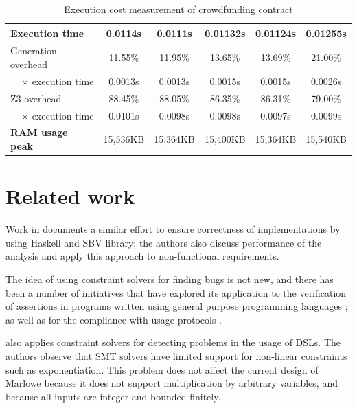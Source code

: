 \documentclass[english,runningheads]{llncs}
\begin{document}
\begin{table}[]
{\begin{tabular}{l||lllll}
\textbf{Execution time}                & \multicolumn{1}{c|}{0.0114s}  & \multicolumn{1}{c|}{0.0111s}  & \multicolumn{1}{c|}{0.01132s} & \multicolumn{1}{c|}{0.01124s} & \multicolumn{1}{c}{0.01255s} \\ \hline
Generation overhead                    & \multicolumn{1}{c|}{11.55\%}  & \multicolumn{1}{c|}{11.95\%}  & \multicolumn{1}{c|}{13.65\%}  & \multicolumn{1}{c|}{13.69\%}  & \multicolumn{1}{c}{21.00\%} \\ \hline
\multicolumn{1}{r||}{× execution time} & \multicolumn{1}{c|}{0.0013s}  & \multicolumn{1}{c|}{0.0013s}  & \multicolumn{1}{c|}{0.0015s}  & \multicolumn{1}{c|}{0.0015s}  & \multicolumn{1}{c}{0.0026s} \\ \hline
Z3 overhead                            & \multicolumn{1}{c|}{88.45\%}  & \multicolumn{1}{c|}{88.05\%}  & \multicolumn{1}{c|}{86.35\%}  & \multicolumn{1}{c|}{86.31\%}  & \multicolumn{1}{c}{79.00\%} \\ \hline
\multicolumn{1}{r||}{× execution time} & \multicolumn{1}{c|}{0.0101s}  & \multicolumn{1}{c|}{0.0098s}  & \multicolumn{1}{c|}{0.0098s}  & \multicolumn{1}{c|}{0.0097s}  & \multicolumn{1}{c}{0.0099s} \\ \hline
\textbf{RAM usage peak}                & \multicolumn{1}{c|}{15,536KB} & \multicolumn{1}{c|}{15,364KB} & \multicolumn{1}{c|}{15,400KB} & \multicolumn{1}{c|}{15,364KB} & \multicolumn{1}{c}{15,540KB}
\end{tabular}
}
\caption{Execution cost measurement of crowdfunding contract\label{table3}}
\end{table}

\section{Related work}

Work in \cite{mokhov2019formal} documents a similar effort to ensure
correctness of implementations by using Haskell and SBV library; the
authors also discuss performance of the analysis and apply this approach
to non-functional requirements.

The idea of using constraint solvers for finding bugs is not new,
and there has been a number of initiatives that have explored its
application to the verification of assertions in programs written
using general purpose programming languages \cite{gulwani2008program,jackson2000finding};
as well as for the compliance with usage protocols
\cite{ball2001automatically,xie2005saturn}.

\cite{keshishzadeh2013early} also applies constraint solvers for
detecting problems in the usage of DSLs. The authors observe that
SMT solvers have limited support for non-linear constraints such as
exponentiation. This problem does not affect the current design of
Marlowe because it does not support multiplication by arbitrary variables,
and because all inputs are integer and bounded finitely.
\end{document}
